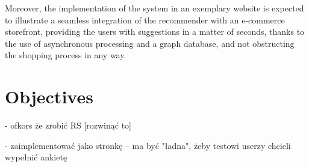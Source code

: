 \documentclass[12pt]{report}
\begin{document}
Moreover, the implementation of the system in an exemplary website is expected to illustrate a seamless integration of the recommender with an e-commerce storefront, providing the users with suggestions in a matter of seconds, thanks to the use of asynchronous processing and a graph database, and not obstructing the shopping process in any way.




\section{Objectives}

- ofkors że zrobić RS [rozwinąć to]

- zaimplementować jako stronkę
    -- ma być "ładna", żeby testowi userzy chcieli wypełnić ankietę
\end{document}
